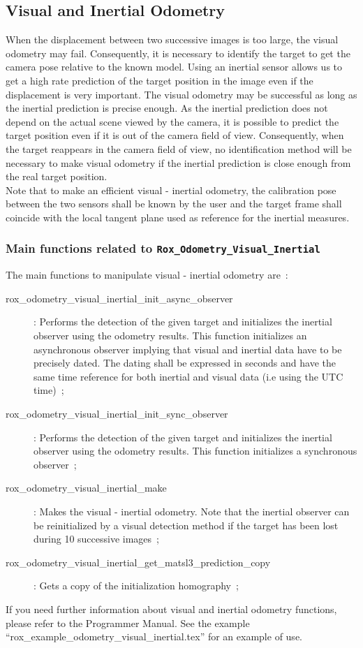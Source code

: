 \subsection{Visual and Inertial Odometry}
\label{sse:odometry_visual_inertial}

When the displacement between two successive images is too large, the visual odometry may fail. Consequently, it is necessary to identify the target to get the camera pose relative to the known model. Using an inertial sensor allows us to get a high rate prediction of the target position in the image even if the displacement is very important. The visual odometry may be successful as long as the inertial prediction is precise enough. As the inertial prediction does not depend on the actual scene viewed by the camera, it is possible to predict the target position even if it is out of the camera field of view. Consequently, when the target reappears in the camera field of view, no identification method will be necessary to make visual odometry if the inertial prediction is close enough from the real target position. \\
Note that to make an efficient visual - inertial odometry, the calibration pose between the two sensors shall be known by the user and the target frame shall coincide with the local tangent plane used as reference for the inertial measures.    

\subsubsection{Main functions related to {\tt Rox\_Odometry\_Visual\_Inertial}}
\label{sss:odometry_visual_inertial_methods}

The main functions to manipulate visual - inertial odometry are~:
\begin{description}
  \item[rox\_odometry\_visual\_inertial\_init\_async\_observer]: Performs the detection of the given target and initializes the inertial observer using the odometry results. This function initializes an asynchronous observer implying that visual and inertial data have to be precisely dated. The dating shall be expressed in seconds and have the same time reference for both inertial and visual data (i.e using the UTC time)~;
  \item[rox\_odometry\_visual\_inertial\_init\_sync\_observer]: Performs the detection of the given target and initializes the inertial observer using the odometry results. This function initializes a synchronous observer~;
  \item[rox\_odometry\_visual\_inertial\_make]: Makes the visual - inertial odometry. Note that the inertial observer can be reinitialized by a visual detection method if the target has been lost during 10 successive images~;
  \item[rox\_odometry\_visual\_inertial\_get\_matsl3\_prediction\_copy]: Gets a copy of the initialization homography~;
\end{description}

If you need further information about visual and inertial odometry functions, please refer to the Programmer Manual.
See the example ``rox\_example\_odometry\_visual\_inertial.tex'' for an
example of use.

% 
